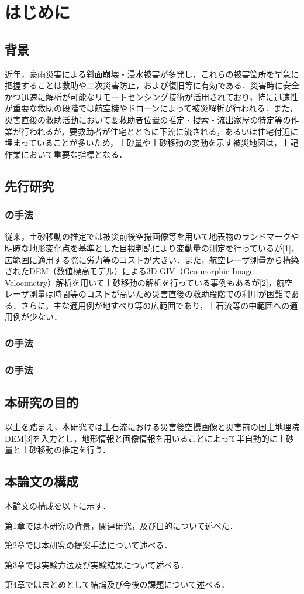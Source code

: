 \chapter{はじめに}

  \section{背景}
    近年，豪雨災害による斜面崩壊・浸水被害が多発し，これらの被害箇所を早急に把握することは救助や二次災害防止，および復旧等に有効である．災害時に安全かつ迅速に解析が可能なリモートセンシング技術が活用されており，特に迅速性が重要な救助の段階では航空機やドローンによって被災解析が行われる．また，災害直後の救助活動において要救助者位置の推定・捜索・流出家屋の特定等の作業が行われるが，要救助者が住宅とともに下流に流される，あるいは住宅付近に埋まっていることが多いため，土砂量や土砂移動の変動を示す被災地図は，上記作業において重要な指標となる．

  \section{先行研究}
    \subsection{の手法}
      従来，土砂移動の推定では被災前後空撮画像等を用いて地表物のランドマークや明瞭な地形変化点を基準とした目視判読により変動量の測定を行っているが[1]，広範囲に適用する際に労力等のコストが大きい．また，航空レーザ測量から構築されたDEM（数値標高モデル）による3D-GIV（Geo-morphic Image Velocimetry）解析を用いて土砂移動の解析を行っている事例もあるが[2]，航空レーザ測量は時間等のコストが高いため災害直後の救助段階での利用が困難である．さらに，主な適用例が地すべり等の広範囲であり，土石流等の中範囲への適用例が少ない．

    \subsection{の手法}

    \subsection{の手法}

  \section{本研究の目的}
    以上を踏まえ，本研究では土石流における災害後空撮画像と災害前の国土地理院DEM[3]を入力とし，地形情報と画像情報を用いることによって半自動的に土砂量と土砂移動の推定を行う．

  \section{本論文の構成}
    本論文の構成を以下に示す．
    
    第1章では本研究の背景，関連研究，及び目的について述べた．

    第2章では本研究の提案手法について述べる．
    
    第3章では実験方法及び実験結果について述べる．

    第4章ではまとめとして結論及び今後の課題について述べる．


